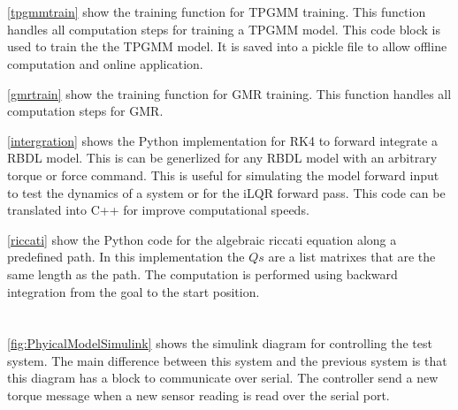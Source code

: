 \chapter{}

\autoref{tpgmmtrain} show the training function for TPGMM training. This function handles all computation steps for training a TPGMM model. This code block is used to train the the TPGMM model. It is saved into a pickle file to allow offline computation and online application.



\autoref{gmrtrain} show the training function for GMR training. This function handles all computation steps for GMR. 



\autoref{intergration} shows the Python implementation for RK4 to forward integrate a RBDL model. This is can be generlized for any RBDL model with an arbitrary torque or force command. This is useful for simulating the model forward input to test the dynamics of a system or for the iLQR forward pass. This code can be translated into C++ for improve computational speeds. 



\autoref{riccati} show the Python code for the algebraic riccati equation along a predefined path. In this implementation the $Qs$ are a list matrixes that are the same length as the path. The computation is performed using backward integration from the goal to the start position.  






\chapter{}

\autoref{fig:PhyicalModelSimulink} shows the simulink diagram for controlling the test system. The main difference between this system and the previous system is that this diagram has a block to communicate over serial. The controller send a new torque message when a new sensor reading is read over the serial port.

